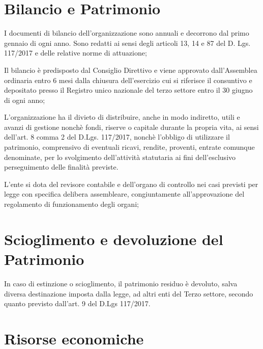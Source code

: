 \documentclass[legalpaper, 11pt]{exam}
\let\tempone\enumerate
\let\temptwo\endenumerate
\renewenvironment{enumerate}{\tempone\addtolength{\itemsep}{-0.45\baselineskip}}{\temptwo}
\begin{document}
{\section{Bilancio e Patrimonio}
\begin{enumerate}
 \item I documenti di bilancio dell’organizzazione sono annuali e decorrono dal primo gennaio di ogni anno. Sono redatti ai sensi degli articoli 13, 14 e 87 del D. Lgs. 117/2017 e delle relative norme di attuazione;
 \item Il bilancio è predisposto dal Consiglio Direttivo e viene approvato dall’Assemblea ordinaria entro 6 mesi dalla chiusura dell’esercizio cui si riferisce il consuntivo e depositato presso il Registro unico nazionale del terzo settore entro il 30 giugno di ogni anno;
 \item L’organizzazione ha il divieto di distribuire, anche in modo indiretto, utili e avanzi di gestione nonchè fondi, riserve o capitale durante la propria vita, ai sensi dell’art. 8 comma 2 del D.Lgs. 117/2017, nonchè l’obbligo di utilizzare il patrimonio, comprensivo di eventuali ricavi, rendite, proventi, entrate comunque denominate, per lo svolgimento dell’attività statutaria ai fini dell’esclusivo perseguimento delle finalità previste.
 \item L’ente si dota del revisore contabile e dell’organo di controllo nei casi previsti per legge con specifica delibera assembleare, congiuntamente all’approvazione del regolamento di funzionamento degli organi;
 
\end{enumerate}

\section{Scioglimento e devoluzione del Patrimonio}
\begin{enumerate}
 \item In caso di estinzione o scioglimento, il patrimonio residuo è devoluto, salva diversa destinazione imposta dalla legge, ad altri enti del Terzo settore, secondo quanto previsto dall’art. 9 del D.Lgs 117/2017.
\end{enumerate}

\section{Risorse economiche}

}
\end{document}
